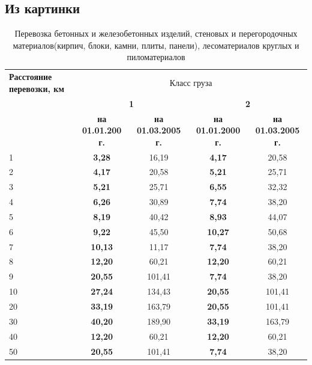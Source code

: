 \subsection{Из картинки}
\begin{table}[!hbp]
    \centering
    \caption{Перевозка бетонных и железобетонных изделий, стеновых и перегородочных материалов(кирпич, блоки, камни, плиты, панели), лесоматериалов круглых и пиломатериалов}
    \label{tab:table1}
    \begin{tabular}{| p{} |c|c|c|c|}
        \hline
        \textbf{Расстояние перевозки, км} & \multicolumn{4}{|c|}{Класс груза} \\
        \cline{2-5}
        & \multicolumn{2}{|c|}{\textbf{1}} & \multicolumn{2}{|c|}{\textbf{2}} \\ 
        \cline{2-5}
        & \textbf{на 01.01.200 г.} & \textbf{на 01.03.2005 г.} & \textbf{ на 01.01.2000 г.} & \textbf{на 01.03.2005 г.} \\ \hline
        1 & \textbf{3,28} & 16,19 & \textbf{4,17} & 20,58 \\ 
        \hline
        2 & \textbf{4,17} & 20,58 & \textbf{5,21} & 25,71 \\ 
        \hline
        3 & \textbf{5,21} & 25,71 & \textbf{6,55} & 32,32 \\ 
        \hline
        4 & \textbf{6,26} & 30,89 & \textbf{7,74} & 38,20 \\ 
        \hline
        5 & \textbf{8,19} & 40,42 & \textbf{8,93} & 44,07 \\ 
        \hline
        6 & \textbf{9,22} & 45,50 & \textbf{10,27} & 50,68 \\ 
        \hline
        7 & \textbf{10,13} & 11,17 & \textbf{7,74} & 38,20\\ 
        \hline
        8 & \textbf{12,20} & 60,21 & \textbf{12,20} & 60,21\\ 
        \hline
        9 & \textbf{20,55} & 101,41 & \textbf{7,74} & 38,20\\ 
        \hline
        10 & \textbf{27,24} & 134,43 & \textbf{20,55} & 101,41\\ \hline
        20 & \textbf{ 33,19} & 163,79 &  \textbf{20,55} & 101,41 \\ \hline
        30 & \textbf{40,20} & 189,90 &  \textbf{ 33,19} & 163,79\\ \hline
        40 & \textbf{12,20} & 60,21 & \textbf{12,20} & 60,21\\ 
        \hline
        50 & \textbf{20,55} & 101,41 & \textbf{7,74} & 38,20\\ 

\end{tabular}
\end{table}
